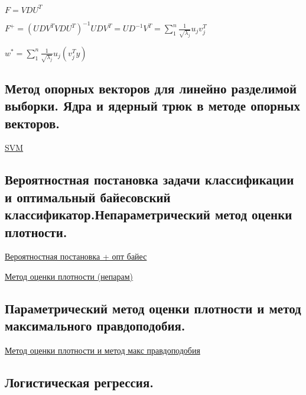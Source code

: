 \documentclass{article}
\begin{document}
$F = VDU^T$

$F^+ = (U D V^T V D U^T)^{-1} U D V^T = U D^{-1} V^T = \sum\limits_1^n
\frac{1}{\sqrt{\lambda_j}} u_j v_j^T$

$w^* = \sum\limits_1^n \frac{1}{\sqrt{\lambda_j}} u_j (v_j^T y)$


\subsection{Метод опорных векторов для линейно разделимой выборки. Ядра и ядерный
трюк в методе опорных векторов.}

\href{https://neerc.ifmo.ru/wiki/index.php?title=%D0%9C%D0%B5%D1%82%D0%BE%D0%B4_%D0%BE%D0%BF%D0%BE%D1%80%D0%BD%D1%8B%D1%85_%D0%B2%D0%B5%D0%BA%D1%82%D0%BE%D1%80%D0%BE%D0%B2_(SVM)}{SVM}


\subsection{Вероятностная постановка задачи классификации и оптимальный
байесовский классификатор.Непараметрический метод оценки плотности.}

\href{
	https://neerc.ifmo.ru/wiki/index.php?title=%
}{Вероятностная постановка + опт байес}

\href{
	http://www.machinelearning.ru/wiki/index.php?title=%
}{
	Метод оценки плотности (непарам)
}


\subsection{Параметрический метод оценки плотности и метод максимального
правдоподобия.}

\href{
	http://www.machinelearning.ru/wiki/index.php?title=%
}{
	Метод оценки плотности и метод макс правдоподобия
}

\subsection{Логистическая регрессия.}
\end{document}
